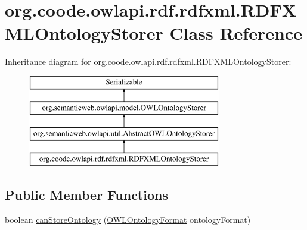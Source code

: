 \hypertarget{classorg_1_1coode_1_1owlapi_1_1rdf_1_1rdfxml_1_1_r_d_f_x_m_l_ontology_storer}{\section{org.\-coode.\-owlapi.\-rdf.\-rdfxml.\-R\-D\-F\-X\-M\-L\-Ontology\-Storer Class Reference}
\label{classorg_1_1coode_1_1owlapi_1_1rdf_1_1rdfxml_1_1_r_d_f_x_m_l_ontology_storer}
}
Inheritance diagram for org.\-coode.\-owlapi.\-rdf.\-rdfxml.\-R\-D\-F\-X\-M\-L\-Ontology\-Storer\-:\begin{figure}[H]
\begin{center}
\leavevmode
\includegraphics[height=4.000000cm]{classorg_1_1coode_1_1owlapi_1_1rdf_1_1rdfxml_1_1_r_d_f_x_m_l_ontology_storer}
\end{center}
\end{figure}
\subsection*{Public Member Functions}
\begin{DoxyCompactItemize}
\item 
boolean \hyperlink{classorg_1_1coode_1_1owlapi_1_1rdf_1_1rdfxml_1_1_r_d_f_x_m_l_ontology_storer_a0be066dc4db90ace9d44bd5d50bcde3b}{can\-Store\-Ontology} (\hyperlink{classorg_1_1semanticweb_1_1owlapi_1_1model_1_1_o_w_l_ontology_format}{O\-W\-L\-Ontology\-Format} ontology\-Format)
\end{DoxyCompactItemize}
